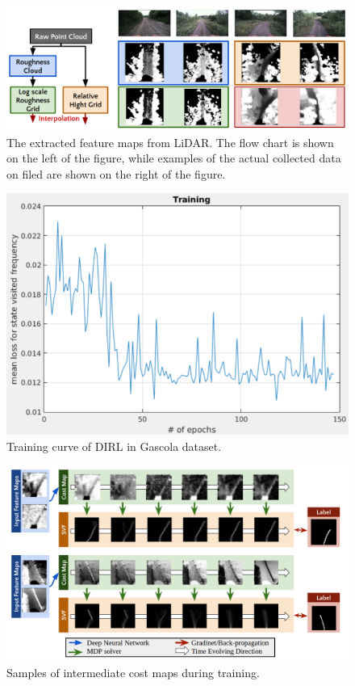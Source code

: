 \documentclass[../thesis.tex]{subfiles}
\begin{document}
\begin{figure}[t]
    	\begin{center}
    	 \centerline{\includegraphics[width=\columnwidth]{./DIRL/fig/lidar_feature_map.png}}
           	\caption{The extracted feature maps from LiDAR. The flow chart is shown on the left of the figure, while examples of the actual collected data on filed are shown on the right of the figure.}
           	\label{fig:lidar_feature_map}
    	\end{center}
\end{figure}
 
 
\begin{figure}[t]
    	\begin{center}
    	 \centerline{\includegraphics[width=0.5\columnwidth]{./DIRL/fig/dirl_training_curve.png}}
           	\caption{Training curve of DIRL in Gascola dataset.}
           	\label{fig:dirl_learning_curve}
    	\end{center}
\end{figure}
 
\begin{figure}[t]
    	\begin{center}
    	 \centerline{\includegraphics[width=\columnwidth]{./DIRL/fig/inter_cost_map.png}}
           	\caption{Samples of intermediate cost maps during training.}
           	\label{fig:inter_cost_map}
    	\end{center}
\end{figure}
 
\end{document}

